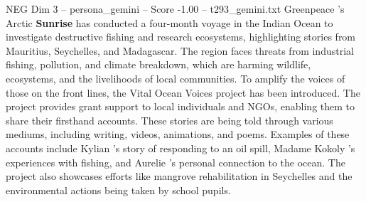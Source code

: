 \begin{textsample}{NEG Dim 3 – persona\_gemini – Score -1.00 – t293\_gemini.txt}  \label{ex:f3_neg_012}
Greenpeace 's Arctic \textbf{Sunrise} has conducted a four-month voyage in the Indian Ocean to investigate destructive fishing and research ecosystems, highlighting stories from Mauritius, Seychelles, and Madagascar.
The region faces threats from industrial fishing, pollution, and climate breakdown, which are harming wildlife, ecosystems, and the livelihoods of local communities.
To amplify the voices of those on the front lines, the Vital Ocean Voices project has been introduced.
The project provides grant support to local individuals and NGOs, enabling them to share their firsthand accounts.
These stories are being told through various mediums, including writing, videos, animations, and poems.
Examples of these accounts include Kylian 's story of responding to an oil spill, Madame Kokoly 's experiences with fishing, and Aurelie 's personal connection to the ocean.
The project also showcases efforts like mangrove rehabilitation in Seychelles and the environmental actions being taken by school pupils.

\end{textsample}

